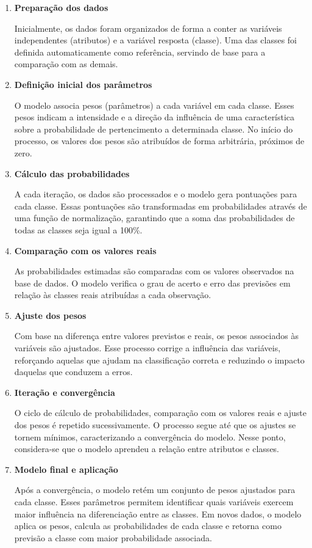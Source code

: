 \documentclass[
  letterpaper,
  DIV=11,
  numbers=noendperiod]{scrartcl}
\begin{document}
\begin{enumerate}
\def\labelenumi{\arabic{enumi}.}
\item
  \textbf{Preparação dos dados}

  Inicialmente, os dados foram organizados de forma a conter as
  variáveis independentes (atributos) e a variável resposta (classe).
  Uma das classes foi definida automaticamente como referência, servindo
  de base para a comparação com as demais.
\item
  \textbf{Definição inicial dos parâmetros}

  O modelo associa pesos (parâmetros) a cada variável em cada classe.
  Esses pesos indicam a intensidade e a direção da influência de uma
  característica sobre a probabilidade de pertencimento a determinada
  classe. No início do processo, os valores dos pesos são atribuídos de
  forma arbitrária, próximos de zero.
\item
  \textbf{Cálculo das probabilidades}

  A cada iteração, os dados são processados e o modelo gera pontuações
  para cada classe. Essas pontuações são transformadas em probabilidades
  através de uma função de normalização, garantindo que a soma das
  probabilidades de todas as classes seja igual a 100\%.
\item
  \textbf{Comparação com os valores reais}

  As probabilidades estimadas são comparadas com os valores observados
  na base de dados. O modelo verifica o grau de acerto e erro das
  previsões em relação às classes reais atribuídas a cada observação.
\item
  \textbf{Ajuste dos pesos}

  Com base na diferença entre valores previstos e reais, os pesos
  associados às variáveis são ajustados. Esse processo corrige a
  influência das variáveis, reforçando aquelas que ajudam na
  classificação correta e reduzindo o impacto daquelas que conduzem a
  erros.
\item
  \textbf{Iteração e convergência}

  O ciclo de cálculo de probabilidades, comparação com os valores reais
  e ajuste dos pesos é repetido sucessivamente. O processo segue até que
  os ajustes se tornem mínimos, caracterizando a convergência do modelo.
  Nesse ponto, considera-se que o modelo aprendeu a relação entre
  atributos e classes.
\item
  \textbf{Modelo final e aplicação}

  Após a convergência, o modelo retém um conjunto de pesos ajustados
  para cada classe. Esses parâmetros permitem identificar quais
  variáveis exercem maior influência na diferenciação entre as classes.
  Em novos dados, o modelo aplica os pesos, calcula as probabilidades de
  cada classe e retorna como previsão a classe com maior probabilidade
  associada.
\end{enumerate}
\end{document}

